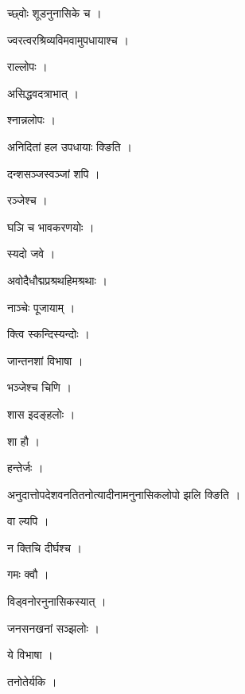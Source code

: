 \documentclass[10pt, openany]{book}
\begin{document}
\noindent च्छ्वोः शूडनुनासिके च ।

\noindent ज्वरत्वरश्रिव्यविमवामुपधायाश्च ।

\noindent राल्लोपः ।

\noindent असिद्धवदत्राभात् ।

\noindent श्नान्नलोपः ।

\noindent अनिदितां हल उपधायाः क्ङिति ।

\noindent दन्शसञ्जस्वञ्जां शपि ।

\noindent रञ्जेश्च ।

\noindent घञि च भावकरणयोः ।

\noindent स्यदो जवे ।

\noindent अवोदैधौद्मप्रश्रथहिमश्रथाः ।

\noindent नाञ्चेः पूजायाम् ।

\noindent क्त्वि स्कन्दिस्यन्दोः ।

\noindent जान्तनशां विभाषा ।

\noindent भञ्जेश्च चिणि ।

\noindent शास इदङ्हलोः ।

\noindent शा हौ ।

\noindent हन्तेर्जः ।

\noindent अनुदात्तोपदेशवनतितनोत्यादीनामनुनासिकलोपो झलि क्ङिति ।

\noindent वा ल्यपि ।

\noindent न क्तिचि दीर्घश्च ।

\noindent गमः क्वौ ।

\noindent विड्वनोरनुनासिकस्यात् ।

\noindent जनसनखनां सञ्झलोः ।

\noindent ये विभाषा ।

\noindent तनोतेर्यकि ।
\end{document}
